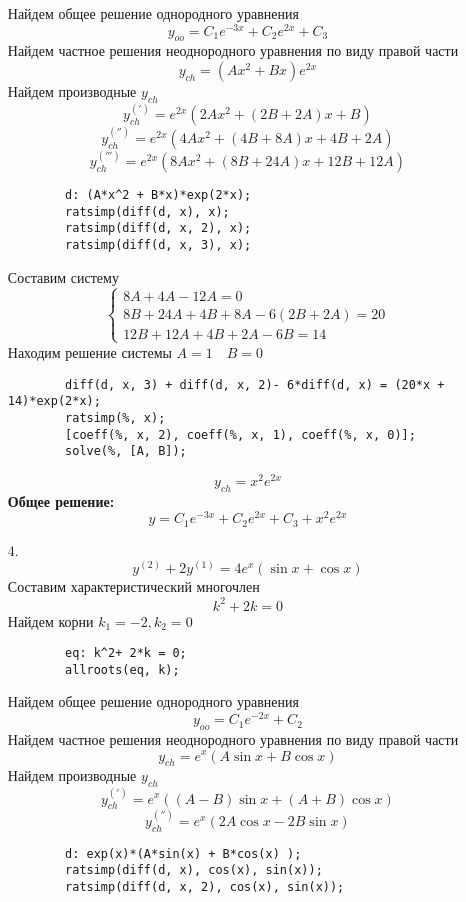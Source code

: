 \documentclass[a4paper, 12pt, oneside]{scrartcl}
\begin{document}
\begin{enumerate}
		Найдем общее решение однородного уравнения \\
		$$ y_{oo} = C_{1}e^{-3x} + C_{2}e^{2x} + C_{3} $$
		Найдем частное решения неоднородного уравнения по виду правой части \\
		$$ y_{ch} = (Ax^2 + Bx)e^{2x} $$
		Найдем производные $ y_{ch} $
		$$ y_{ch}^{(')} = e^{2x}(2Ax^2 + (2B + 2A)x + B)$$
		$$ y_{ch}^{('')} = e^{2x}(4Ax^2 + (4B + 8A)x + 4B + 2A) $$
		$$ y_{ch}^{(''')} = e^{2x}(8Ax^2 + (8B + 24A)x + 12B + 12A) $$
		\begin{verbatim}
		d: (A*x^2 + B*x)*exp(2*x);
		ratsimp(diff(d, x), x);
		ratsimp(diff(d, x, 2), x);
		ratsimp(diff(d, x, 3), x);
		\end{verbatim}

		Составим систему \\
		\begin{equation*}
		  \begin{cases}
   			8A + 4A - 12A = 0 \\
   			8B + 24A + 4B + 8A - 6(2B + 2A) = 20 \\
   			12B + 12A + 4B + 2A - 6B = 14
		  \end{cases}
		\end{equation*}
		Находим решение системы $A = 1 \quad B=0  $ \\
		\begin{verbatim}
		diff(d, x, 3) + diff(d, x, 2)- 6*diff(d, x) = (20*x + 14)*exp(2*x);
		ratsimp(%, x);
		[coeff(%, x, 2), coeff(%, x, 1), coeff(%, x, 0)];
		solve(%, [A, B]);
		\end{verbatim}

		$$ y_{ch} = x^2e^{2x}  $$
		\textbf{Общее решение: }
		$$ y = C_{1}e^{-3x} + C_{2}e^{2x} + C_{3} + x^2e^{2x} $$
		
		\item[4.]
		$$ y^{(2)} + 2y^{(1)} = 4e^{x}(\sin{x} + \cos{x}) $$
		Составим характеристический многочлен \\
		$$ k^{2} + 2k = 0 $$
		Найдем корни $ k_{1} = -2, k_{2} = 0 $ \\
		\begin{verbatim}
		eq: k^2+ 2*k = 0; 
		allroots(eq, k);
		\end{verbatim} 

		Найдем общее решение однородного уравнения \\
		$$ y_{oo} = C_{1}e^{-2x} + C_{2} $$
		Найдем частное решения неоднородного уравнения по виду правой части \\
		$$ y_{ch} = e^{x}(A\sin{x} + B\cos{x}) $$
		Найдем производные $ y_{ch} $
		$$ y_{ch}^{(')} = e^{x}((A - B)\sin{x} + (A + B)\cos{x}) $$
		$$ y_{ch}^{('')} = e^{x}(2A\cos{x} - 2B\sin{x}) $$
		\begin{verbatim}
		d: exp(x)*(A*sin(x) + B*cos(x) );
		ratsimp(diff(d, x), cos(x), sin(x));
		ratsimp(diff(d, x, 2), cos(x), sin(x));
		\end{verbatim} 


\end{enumerate}
\end{document}
